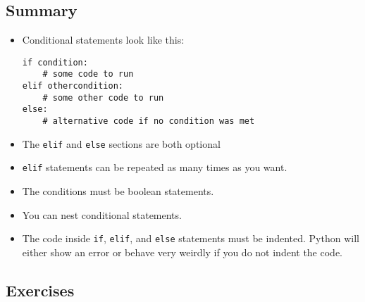 \documentclass[11pt,hidelinks]{article}
\begin{document}
\subsection{Summary}

\begin{itemize}
  \item Conditional statements look like this:
    \begin{lstlisting}
if condition:
    # some code to run
elif othercondition:
    # some other code to run
else:
    # alternative code if no condition was met
    \end{lstlisting}

  \item The \lstinline!elif! and \lstinline!else! sections are both optional
  \item \lstinline!elif! statements can be repeated as many times as you want.
  \item The conditions must be boolean statements.
  \item You can nest conditional statements.
  \item The code inside \lstinline!if!, \lstinline!elif!, and \lstinline!else!
    statements must be indented. Python will either show an error or behave very
    weirdly if you do not indent the code.
\end{itemize}

\subsection{Exercises}
\label{subsec:ifex}
\end{document}
